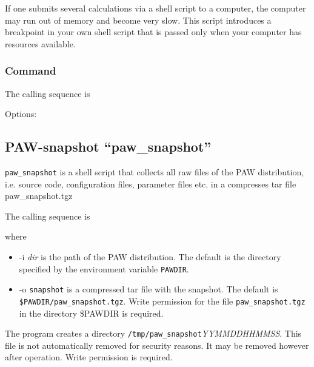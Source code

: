 \documentclass[final,12pt,makeidx,DIV=calc]{article}
\begin{document}
{{{{{{If one submits several calculations via a shell script to a computer, the
computer may run out of memory and become very slow. This script
introduces a breakpoint in your own shell script that is passed only
when your computer has resources available.

\subsubsection{Command}
The calling sequence is

\bigskip{}
\vspace{0.5cm}

\noindent Options:\\[2mm]
\hspace*{1cm}

\subsection{PAW-snapshot ``paw\_snapshot''}
{\tt paw\_snapshot} is a shell script that collects all raw files of
the PAW distribution, i.e. source code, configuration files,
parameter files etc. in a compresses tar file paw\_snapshot.tgz

The calling sequence is

\bigskip{}
\bigskip

where 
\begin{itemize}
\item -i \textit{dir} is the path of the PAW distribution. The default
  is the directory specified by the environment variable
  \texttt{PAWDIR}.
\item -o \texttt{snapshot} is a compressed tar file with the
  snapshot. The default is \texttt{\$PAWDIR/paw\_snapshot.tgz}.  Write
  permission for the file \texttt{paw\_snapshot.tgz} in the directory
  \$PAWDIR is required.  
\end{itemize}
The program creates a directory
\texttt{/tmp/paw\_snapshot}\textit{YYMMDDHHMMSS}. This file is not
automatically removed for security reasons. It may be removed however
after operation. Write permission is required.


}}}}}}
\end{document}
